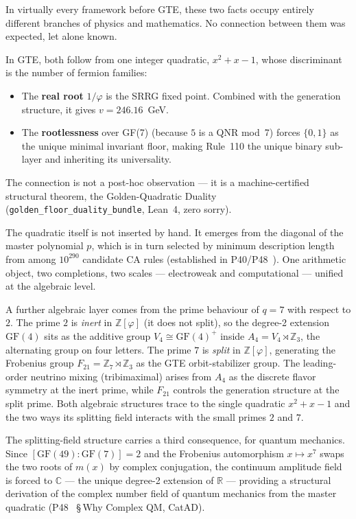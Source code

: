 \documentclass[11pt,a4paper]{article}
\newcommand{\lean}[1]{\texttt{#1}}
\begin{document}
In virtually every framework before GTE, these two facts occupy entirely
different branches of physics and mathematics.  No connection between them
was expected, let alone known.

\medskip
In GTE, both follow from one integer quadratic, $x^2 + x - 1$, whose
discriminant is the number of fermion families:

\begin{itemize}[itemsep=4pt]
  \item The \textbf{real root} $1/\varphi$ is the SRRG fixed point.
    Combined with the generation structure, it gives $v = 246.16$~GeV.
  \item The \textbf{rootlessness} over GF(7) (because $5$ is a QNR mod~7)
    forces $\{0,1\}$ as the unique minimal invariant floor, making
    Rule~110 the unique binary sub-layer and inheriting its universality.
\end{itemize}

The connection is not a post-hoc observation — it is a machine-certified
structural theorem, the Golden-Quadratic Duality
(\lean{golden\_floor\_duality\_bundle}, Lean~4, zero sorry).

\medskip
The quadratic itself is not inserted by hand.  It emerges from the diagonal
of the master polynomial $p$, which is in turn selected by minimum description
length from among $10^{290}$ candidate CA rules (established in P40/P48~\cite{SpivackGTECompleteFramework}).
One arithmetic object, two completions, two scales — electroweak and
computational — unified at the algebraic level.

\medskip
A further algebraic layer comes from the prime behaviour of $q = 7$
with respect to $2$.  The prime $2$ is \emph{inert} in $\mathbb{Z}[\varphi]$
(it does not split), so the degree-2 extension $\mathrm{GF}(4)$ sits as the
additive group $V_4 \cong \mathrm{GF}(4)^+$ inside $A_4 = V_4 \rtimes \mathbb{Z}_3$,
the alternating group on four letters.  The prime $7$ is \emph{split} in
$\mathbb{Z}[\varphi]$, generating the Frobenius group $F_{21} = \mathbb{Z}_7 \rtimes \mathbb{Z}_3$
as the GTE orbit-stabilizer group.  The leading-order neutrino mixing
(tribimaximal) arises from $A_4$ as the discrete flavor symmetry at the
inert prime, while $F_{21}$ controls the generation structure at the split
prime.  Both algebraic structures trace to the single quadratic $x^2+x-1$
and the two ways its splitting field interacts with the small primes $2$ and $7$.

The splitting-field structure carries a third consequence, for quantum mechanics.
Since $[\mathrm{GF}(49):\mathrm{GF}(7)] = 2$ and the Frobenius automorphism
$x \mapsto x^7$ swaps the two roots of $m(x)$ by complex conjugation, the
continuum amplitude field is forced to $\mathbb{C}$ — the unique degree-2 extension
of $\mathbb{R}$ — providing a structural derivation of the complex number field of
quantum mechanics from the master quadratic
(P48~\cite{SpivackGTECompleteFramework} §\,Why Complex QM, CatAD).
\end{document}
